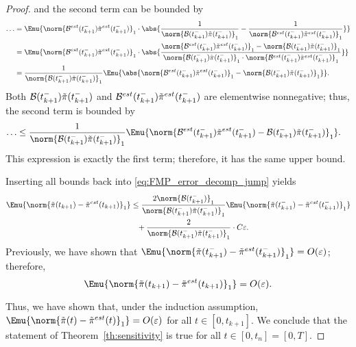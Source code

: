 \begin{proof}
and the second term can be bounded by
\begin{align*}
    \dots &= \Emu{ \norm{ \mathcal{B}^{est}(t_{k+1}^-) \Tilde{\pi}^{est}(t_{k+1}^-) }_1 \cdot \abs{ \frac{1}{\norm{\mathcal{B}(t_{k+1}^-) \Tilde{\pi}(t_{k+1}^-)}_1} - \frac{1}{\norm{\mathcal{B}^{est}(t_{k+1}^-) \Tilde{\pi}^{est}(t_{k+1}^-)}_1} } } \\
    &= \Emu{ \norm{ \mathcal{B}^{est}(t_{k+1}^-) \Tilde{\pi}^{est}(t_{k+1}^-) }_1 \cdot \abs{ \frac{ \norm{\mathcal{B}^{est}(t_{k+1}^-) \Tilde{\pi}^{est}(t_{k+1}^-)}_1 - \norm{\mathcal{B}(t_{k+1}^-) \Tilde{\pi}(t_{k+1}^-)}_1 }{\norm{\mathcal{B}(t_{k+1}^-) \Tilde{\pi}(t_{k+1}^-)}_1 \cdot \norm{\mathcal{B}^{est}(t_{k+1}^-) \Tilde{\pi}^{est}(t_{k+1}^-)}_1} } } \\
    &= \frac{1}{\norm{\mathcal{B}(t_{k+1}^-) \Tilde{\pi}(t_{k+1}^-)}_1} \Emu{ \abs{ \norm{\mathcal{B}^{est}(t_{k+1}^-) \Tilde{\pi}^{est}(t_{k+1}^-)}_1 - \norm{\mathcal{B}(t_{k+1}^-) \Tilde{\pi}(t_{k+1}^-)}_1 } } .
\end{align*}
Both $\mathcal{B}(t_{k+1}^-) \Tilde{\pi}(t_{k+1}^-)$ and $\mathcal{B}^{est}(t_{k+1}^-) \Tilde{\pi}^{est}(t_{k+1}^-)$ are elementwise nonnegative; thus, the second term is bounded by
\begin{align*}
    \dots &\leq \frac{1}{\norm{\mathcal{B}(t_{k+1}^-) \Tilde{\pi}(t_{k+1}^-)}_1} \Emu{ \norm{\mathcal{B}^{est}(t_{k+1}^-) \Tilde{\pi}^{est}(t_{k+1}^-) - \mathcal{B}(t_{k+1}^-) \Tilde{\pi}(t_{k+1}^-)}_1 }.
\end{align*}
This expression is exactly the first term; therefore, it has the same upper bound.

Inserting all bounds back into \eqref{eq:FMP_error_decomp_jump} yields
\begin{align*}
    \Emu{\norm{\Tilde{\pi}(t_{k+1}) - \Tilde{\pi}^{est}(t_{k+1})}_1} 
    &\leq \frac{2 \norm{\mathcal{B}(t_{k+1}^-)}_1}{\norm{\mathcal{B}(t_{k+1}^-) \Tilde{\pi}(t_{k+1}^-)}_1} \Emu{ \norm{ \Tilde{\pi}(t_{k+1}^-) - \Tilde{\pi}^{est}(t_{k+1}^-) }_1 } \\
    &\phantom{\leq} + \frac{2}{\norm{\mathcal{B}(t_{k+1}^-) \Tilde{\pi}(t_{k+1}^-)}_1} \cdot C \varepsilon.
\end{align*}
Previously, we have shown that $\Emu{ \norm{ \Tilde{\pi}(t_{k+1}^-) - \Tilde{\pi}^{est}(t_{k+1}^-) }_1 } = O(\varepsilon)$; therefore, $$\Emu{ \norm{ \Tilde{\pi}(t_{k+1}) - \Tilde{\pi}^{est}(t_{k+1}) }_1 } = O(\varepsilon).$$ 

Thus, we have shown that, under the induction assumption, $\Emu{ \norm{ \Tilde{\pi}(t) - \Tilde{\pi}^{est}(t) }_1 } = O(\varepsilon)$ for all $t \in [0, t_{k+1}]$. We conclude that the statement of Theorem~\ref{th:sensitivity} is true for all $t \in [0, t_n] = [0, T]$.


\end{proof}



